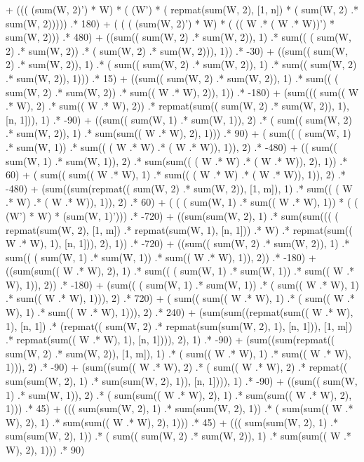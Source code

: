 \documentclass[]{article}
\begin{document}
  + ((( (sum(W, 2)') * W)  * ( (W') * ( repmat(sum(W, 2), [1, n]) * ( sum(W, 2) .* sum(W, 2)))))  .* 180) 
  + ( ( ( (sum(W, 2)') * W) * ( (( W .* ( W .* W))') * sum(W, 2))) .* 480) 
  + ((sum(( sum(W, 2) .* sum(W, 2)), 1)  .* sum(( ( sum(W, 2) .* sum(W, 2)) .* ( sum(W, 2) .* sum(W, 2))), 1))  .* -30) 
  + ((sum(( sum(W, 2) .* sum(W, 2)), 1)  .* ( sum(( sum(W, 2) .* sum(W, 2)), 1) .* sum(( sum(W, 2) .* sum(W, 2)), 1)))  .* 15) 
  + ((sum(( sum(W, 2) .* sum(W, 2)), 1)  .* sum(( ( sum(W, 2) .* sum(W, 2)) .* sum(( W .* W), 2)), 1))  .* -180) 
  + (sum((( sum(( W .* W), 2) .* sum(( W .* W), 2))  .* repmat(sum(( sum(W, 2) .* sum(W, 2)), 1), [n, 1])), 1)  .* -90) 
  + ((sum(( sum(W, 1) .* sum(W, 1)), 2)  .* ( sum(( sum(W, 2) .* sum(W, 2)), 1) .* sum(sum(( W .* W), 2), 1)))  .* 90) 
  + ( sum(( ( sum(W, 1) .* sum(W, 1)) .* sum(( ( W .* W) .* ( W .* W)), 1)), 2) .* -480) 
  + (( sum(( sum(W, 1) .* sum(W, 1)), 2) .* sum(sum(( ( W .* W) .* ( W .* W)), 2), 1))  .* 60) 
  + ( sum(( sum(( W .* W), 1) .* sum(( ( W .* W) .* ( W .* W)), 1)), 2) .* -480) 
  + (sum((sum(repmat(( sum(W, 2) .* sum(W, 2)), [1, m]), 1)  .* sum(( ( W .* W) .* ( W .* W)), 1)), 2)  .* 60) 
  + ( ( ( sum(W, 1) .* sum(( W .* W), 1)) * ( ( (W') * W) * (sum(W, 1)'))) .* -720) 
  + ((sum(sum(W, 2), 1)  .* sum(sum((( ( repmat(sum(W, 2), [1, m]) .* repmat(sum(W, 1), [n, 1])) .* W)  .* repmat(sum(( W .* W), 1), [n, 1])), 2), 1))  .* -720) 
  + ((sum(( sum(W, 2) .* sum(W, 2)), 1)  .* sum(( ( sum(W, 1) .* sum(W, 1)) .* sum(( W .* W), 1)), 2))  .* -180) 
  + ((sum(sum(( W .* W), 2), 1)  .* sum(( ( sum(W, 1) .* sum(W, 1)) .* sum(( W .* W), 1)), 2))  .* -180) 
  + (sum(( ( sum(W, 1) .* sum(W, 1)) .* ( sum(( W .* W), 1) .* sum(( W .* W), 1))), 2)  .* 720) 
  + ( sum(( sum(( W .* W), 1) .* ( sum(( W .* W), 1) .* sum(( W .* W), 1))), 2) .* 240) 
  + (sum(sum((repmat(sum(( W .* W), 1), [n, 1])  .* (repmat(( sum(W, 2) .* repmat(sum(sum(W, 2), 1), [n, 1])), [1, m])  .* repmat(sum(( W .* W), 1), [n, 1]))), 2), 1)  .* -90) 
  + (sum((sum(repmat(( sum(W, 2) .* sum(W, 2)), [1, m]), 1)  .* ( sum(( W .* W), 1) .* sum(( W .* W), 1))), 2)  .* -90) 
  + (sum((sum(( W .* W), 2)  .* ( sum(( W .* W), 2) .* repmat(( sum(sum(W, 2), 1) .* sum(sum(W, 2), 1)), [n, 1]))), 1)  .* -90) 
  + ((sum(( sum(W, 1) .* sum(W, 1)), 2)  .* ( sum(sum(( W .* W), 2), 1) .* sum(sum(( W .* W), 2), 1)))  .* 45) 
  + ((( sum(sum(W, 2), 1) .* sum(sum(W, 2), 1))  .* ( sum(sum(( W .* W), 2), 1) .* sum(sum(( W .* W), 2), 1)))  .* 45) 
  + ((( sum(sum(W, 2), 1) .* sum(sum(W, 2), 1))  .* ( sum(( sum(W, 2) .* sum(W, 2)), 1) .* sum(sum(( W .* W), 2), 1)))  .* 90) 
\end{document}
